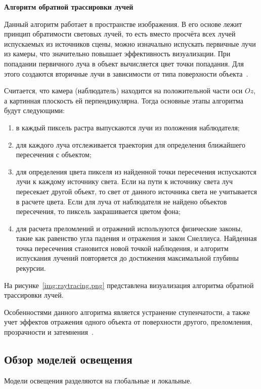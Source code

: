 \textbf{Алгоритм обратной трассировки лучей}

Данный алгоритм работает в пространстве изображения. В его основе лежит принцип обратимости световых лучей, то есть вместо просчёта всех лучей испускаемых из источников сцены, можно изначально испускать первичные лучи из камеры, что значительно повышает эффективность визуализации. При попадании первичного луча в объект вычисляется цвет точки попадания. Для этого создаются вторичные лучи в зависимости от типа поверхности объекта~\cite{rodgers}.

Считается, что камера (наблюдатель) находится на положительной части оси $Oz$, а картинная плоскость ей перпендикулярна.
Тогда основные этапы алгоритма будут следующими:
\begin{enumerate}
	\item в каждый пиксель растра выпускаются лучи из положения наблюдателя;
	\item для каждого луча отслеживается траектория для определения ближайшего пересечения с объектом;
	\item для определения цвета пикселя из найденной точки пересечения испускаются лучи к каждому источнику света. Если на пути к источнику света луч пересекает другой объект, то свет от данного источника света не учитывается в расчете цвета. Если для луча от наблюдателя не найдено объектов пересечения, то пиксель закрашивается цветом фона;
	\item для расчета преломлений и отражений используются физические законы, такие как равенство угла падения и отражения и закон Снеллиуса. Найденная точка пересечения становится новой точкой наблюдения, и алгоритм испускания лучений повторяется до достижения максимальной глубины рекурсии. 
\end{enumerate}

На рисунке~\ref{img:raytracing.png} представлена визуализация алгоритма обратной трассировки лучей.

Особенностями данного алгоритма является устранение ступенчатости, а также учет эффектов отражения одного объекта от поверхности другого, преломления, прозрачности и затемнения~\cite{rodgers}.

\subsection{Обзор моделей освещения}
Модели освещения разделяются на глобальные и локальные.

